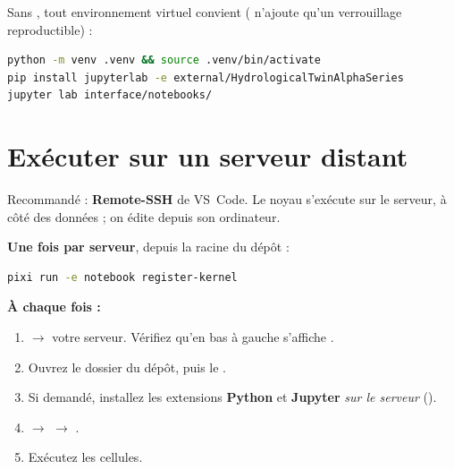 Sans , tout environnement virtuel convient ( n'ajoute qu'un verrouillage reproductible) :

\begin{lstlisting}[language=bash]
python -m venv .venv && source .venv/bin/activate
pip install jupyterlab -e external/HydrologicalTwinAlphaSeries
jupyter lab interface/notebooks/
\end{lstlisting}

\section{Exécuter sur un serveur distant}

Recommandé : \textbf{Remote-SSH} de VS~Code. Le noyau s'exécute sur le serveur, à côté des données ; on édite depuis son ordinateur.

\textbf{Une fois par serveur}, depuis la racine du dépôt :
\begin{lstlisting}[language=bash]
pixi run -e notebook register-kernel
\end{lstlisting}

\textbf{À chaque fois :}
\begin{enumerate}
    \item {} $\rightarrow$ votre serveur. Vérifiez qu'en bas à gauche s'affiche .
    \item Ouvrez le dossier du dépôt, puis le .
    \item Si demandé, installez les extensions \textbf{Python} et \textbf{Jupyter} \emph{sur le serveur} ().
    \item {} $\rightarrow$  $\rightarrow$ .
    \item Exécutez les cellules.
\end{enumerate}



